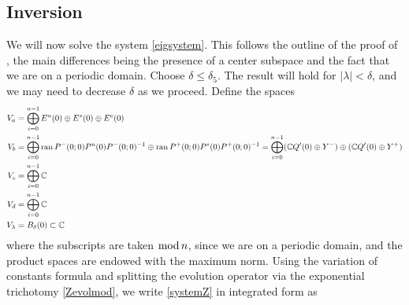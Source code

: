 \documentclass[10pt,reqno]{amsart}
\theoremstyle{plain}
\theoremstyle{definition}
\theoremstyle{remark}
\numberwithin{theorem}{section}
\numberwithin{equation}{section}
\begin{document}
\subsection{Inversion}

We will now solve the system \cref{eigsystem}. This follows the outline of the proof of \cite[Theorem 2]{Sandstede1998}, the main differences being the presence of a center subspace and the fact that we are on a periodic domain. Choose $\delta \leq \delta_5$. The result will hold for $|\lambda| < \delta$, and we may need to decrease $\delta$ as we proceed. Define the spaces
\begin{align*}
V_a &= \bigoplus_{i=0}^{n-1} E^u(0) \oplus E^s(0) \oplus E^c(0) \\
V_b &= \bigoplus_{i=0}^{n-1} \operatorname{ran} P^-(0; 0) P^u(0) P^-(0; 0)^{-1} \oplus \operatorname{ran} P^+(0; 0) P^s(0) P^+(0; 0)^{-1} = \bigoplus_{i=0}^{n-1} (\mathbb{C} Q'(0)\oplus Y^-)\oplus(\mathbb{C} Q'(0)\oplus Y^+)\\
V_c &= \bigoplus_{i=0}^{n-1} \mathbb{C} \\
V_d &= \bigoplus_{i=0}^{n-1} \mathbb{C} \\
V_\lambda &= B_\delta(0) \subset \mathbb{C}
\end{align*}
where the subscripts are taken $\mathop\mathrm{mod}\nolimits n$, since we are on a periodic domain, and the product spaces are endowed with the maximum norm. Using the variation of constants formula and splitting the evolution operator via the exponential trichotomy \cref{Zevolmod}, we write \eqref{systemZ} in integrated form as
\end{document}
